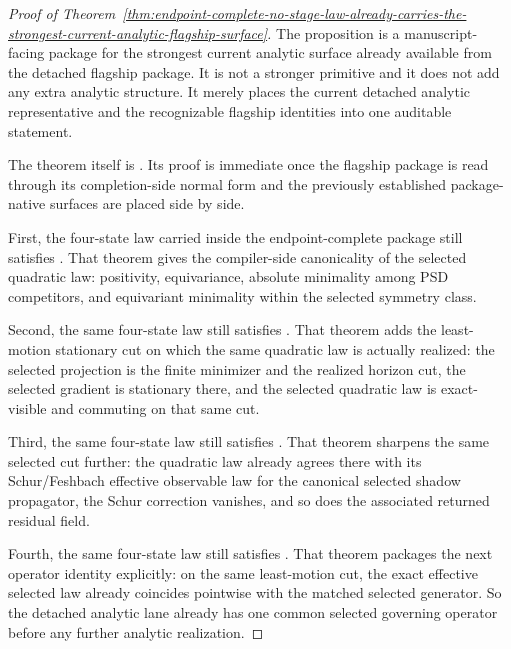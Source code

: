 \begin{proof}[Proof of Theorem~\ref{thm:endpoint-complete-no-stage-law-already-carries-the-strongest-current-analytic-flagship-surface}]
\label{proof:thm:endpoint-complete-no-stage-law-already-carries-the-strongest-current-analytic-flagship-surface}
The proposition
 is a manuscript-facing package
for the strongest current analytic surface already available from the
detached flagship package. It is not a stronger primitive and it does not add
any extra analytic structure. It merely places the current detached analytic
representative and the recognizable flagship identities into one auditable
statement.

The theorem itself is
. Its
proof is immediate once the flagship package is read through its
completion-side normal form and the previously established package-native
surfaces are placed side by side.

First, the four-state law carried inside the endpoint-complete package still
satisfies
.
That theorem gives the compiler-side canonicality of the selected quadratic
law: positivity, equivariance, absolute minimality among PSD competitors, and
equivariant minimality within the selected symmetry class.

Second, the same four-state law still
satisfies
.
That theorem adds the least-motion stationary cut on which the same quadratic
law is actually realized: the selected projection is the finite minimizer and
the realized horizon cut, the selected gradient is stationary there, and the
selected quadratic law is exact-visible and commuting on that same cut.

Third, the same four-state law still
satisfies
.
That theorem sharpens the same selected cut further: the quadratic law already
agrees there with its Schur/Feshbach effective observable law for the
canonical selected shadow propagator, the Schur correction vanishes, and so
does the associated returned residual field.

Fourth, the same four-state law still
satisfies
. That
theorem packages the next operator identity explicitly: on the same
least-motion cut, the exact effective selected law already coincides
pointwise with the matched selected generator. So the detached analytic lane
already has one common selected governing operator before any further
analytic realization.


\end{proof}
